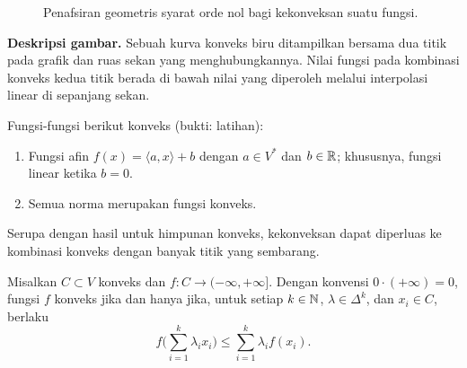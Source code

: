 \begin{figure}
    \centering
        \caption{Penafsiran geometris syarat orde nol bagi kekonveksan suatu fungsi.}
\end{figure}

\noindent\textbf{Deskripsi gambar.} Sebuah kurva konveks biru ditampilkan bersama dua titik pada grafik dan ruas sekan yang menghubungkannya. Nilai fungsi pada kombinasi konveks kedua titik berada di bawah nilai yang diperoleh melalui interpolasi linear di sepanjang sekan.

\begin{example}
    Fungsi-fungsi berikut konveks (bukti: latihan):
    \begin{enumerate}
        \item Fungsi afin $f(x)=\langle a,x\rangle+b$ dengan $a\in V^*$ dan $b\in\mathbb{R}$; khususnya, fungsi linear ketika $b=0$.
        \item Semua norma merupakan fungsi konveks.
    \end{enumerate}
\end{example}

Serupa dengan hasil untuk himpunan konveks, kekonveksan dapat diperluas ke kombinasi konveks dengan banyak titik yang sembarang.

\begin{theorem}[Jensen]
    Misalkan $C\subset V$ konveks dan
    $f:C\rightarrow(-\infty,+\infty]$. Dengan konvensi
    $0\cdot(+\infty)=0$, fungsi $f$ konveks jika dan hanya jika, untuk setiap
    $k\in\mathbb{N}$, $\lambda\in\Delta^k$, dan $x_i\in C$, berlaku
    \begin{equation}
        f\bigg(\sum_{i=1}^k\lambda_i x_i\bigg)\leq\sum_{i=1}^k\lambda_i f(x_i).
    \end{equation}
\end{theorem}


